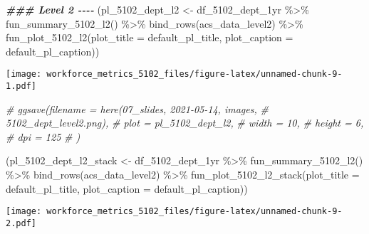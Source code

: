 \documentclass[
]{article}
\newenvironment{Shaded}{\begin{snugshade}}{\end{snugshade}}
\newcommand{\AttributeTok}[1]{\textcolor[rgb]{0.77,0.63,0.00}{#1}}
\newcommand{\CommentTok}[1]{\textcolor[rgb]{0.56,0.35,0.01}{\textit{#1}}}
\newcommand{\DocumentationTok}[1]{\textcolor[rgb]{0.56,0.35,0.01}{\textbf{\textit{#1}}}}
\newcommand{\FunctionTok}[1]{\textcolor[rgb]{0.00,0.00,0.00}{#1}}
\newcommand{\NormalTok}[1]{#1}
\newcommand{\OtherTok}[1]{\textcolor[rgb]{0.56,0.35,0.01}{#1}}
\newcommand{\SpecialCharTok}[1]{\textcolor[rgb]{0.00,0.00,0.00}{#1}}
\begin{document}
\begin{Shaded}
\begin{Highlighting}[]
\DocumentationTok{\#\#\# Level 2 {-}{-}{-}{-}}
\NormalTok{(pl\_5102\_dept\_l2 }\OtherTok{\textless{}{-}}\NormalTok{ df\_5102\_dept\_1yr }\SpecialCharTok{\%\textgreater{}\%} 
     \FunctionTok{fun\_summary\_5102\_l2}\NormalTok{() }\SpecialCharTok{\%\textgreater{}\%} 
     \FunctionTok{bind\_rows}\NormalTok{(acs\_data\_level2) }\SpecialCharTok{\%\textgreater{}\%} 
     \FunctionTok{fun\_plot\_5102\_l2}\NormalTok{(}\AttributeTok{plot\_title =}\NormalTok{ default\_pl\_title, }
                      \AttributeTok{plot\_caption =}\NormalTok{ default\_pl\_caption))}
\end{Highlighting}
\end{Shaded}

\texttt{[image: workforce\_metrics\_5102\_files/figure-latex/unnamed-chunk-9-1.pdf]}

\begin{Shaded}
\begin{Highlighting}[]
\CommentTok{\# ggsave(filename = here(\textquotesingle{}07\_slides\textquotesingle{}, \textquotesingle{}2021{-}05{-}14\textquotesingle{}, \textquotesingle{}images\textquotesingle{}, }
\CommentTok{\#                        \textquotesingle{}5102\_dept\_level2.png\textquotesingle{}), }
\CommentTok{\#        plot = pl\_5102\_dept\_l2, }
\CommentTok{\#        width = 10, }
\CommentTok{\#        height = 6, }
\CommentTok{\#        dpi = 125}
\CommentTok{\#        )}

\NormalTok{(pl\_5102\_dept\_l2\_stack }\OtherTok{\textless{}{-}}\NormalTok{ df\_5102\_dept\_1yr }\SpecialCharTok{\%\textgreater{}\%} 
        \FunctionTok{fun\_summary\_5102\_l2}\NormalTok{() }\SpecialCharTok{\%\textgreater{}\%} 
        \FunctionTok{bind\_rows}\NormalTok{(acs\_data\_level2) }\SpecialCharTok{\%\textgreater{}\%} 
        \FunctionTok{fun\_plot\_5102\_l2\_stack}\NormalTok{(}\AttributeTok{plot\_title =}\NormalTok{ default\_pl\_title, }
                               \AttributeTok{plot\_caption =}\NormalTok{ default\_pl\_caption))}
\end{Highlighting}
\end{Shaded}

\texttt{[image: workforce\_metrics\_5102\_files/figure-latex/unnamed-chunk-9-2.pdf]}
\end{document}
